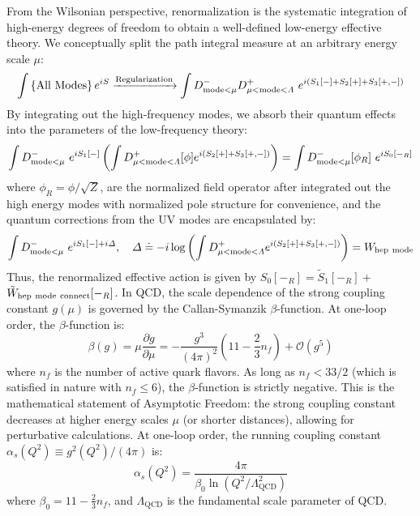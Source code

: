 From the Wilsonian perspective, renormalization is the systematic integration of high-energy degrees of freedom to obtain a well-defined low-energy effective theory. We conceptually split the path integral measure at an arbitrary energy scale $\mu$:
\begin{equation}
\int{\left\{ {\rm All\ Modes} \right\} e^{iS}} \xrightarrow{\rm Regularization}\int{D^-_{{\rm mode}<\mu} D^+_{\mu <{\rm mode}<\varLambda}}\ e^{i\left( S_1\left[ - \right] +S_2\left[ + \right] +S_3\left[ +,- \right] \right)}
\end{equation}
By integrating out the high-frequency modes, we absorb their quantum effects into the parameters of the low-frequency theory:
\begin{equation}
\int{D^-_{{\rm mode}<\mu}\ e^{iS_1\left[ - \right]}\left( \int{D^+_{\mu <{\rm mode}<\varLambda}[\phi]e^{i\left( S_2\left[ + \right] +S_3\left[ +,- \right] \right)}} \right)} =\int{D^-_{{\rm mode}<\mu}}[\phi_R]\ e^{iS_0\left[ -_R \right]}
\end{equation}
where $\phi_R=\phi /\sqrt{Z}$, are the normalized field operator after integrated out the high energy modes with normalized pole structure for convenience, and the quantum corrections from the UV modes are encapsulated by:
\begin{equation}
\int{D^-_{{\rm mode}<\mu}\ e^{iS_1\left[ - \right] +i\varDelta}}, \quad \varDelta \doteq -i\log \left( \int{D^+_{\mu <{\rm mode}<\varLambda}e^{i\left( S_2\left[ + \right] +S_3\left[ +,- \right] \right)}} \right) =W_{\rm hep\ mode}
\end{equation}
Thus, the renormalized effective action is given by $S_0[-_R]=\tilde S_1[-_R]+$
$\tilde W_{\rm hep\ mode\ connect}[-_R]$. In QCD, the scale dependence of the strong coupling constant $g(\mu)$ is governed by the Callan-Symanzik $\beta$-function. At one-loop order, the $\beta$-function is:
\begin{equation}
\beta(g) = \mu \frac{\partial g}{\partial \mu} = - \frac{g^3}{(4\pi)^2} \left( 11 - \frac{2}{3}n_f \right) + \mathcal{O}(g^5)
\label{eq:qcd_beta_function}
\end{equation}
where $n_f$ is the number of active quark flavors. As long as $n_f < 33/2$ (which is satisfied in nature with $n_f \le 6$), the $\beta$-function is strictly negative. This is the mathematical statement of Asymptotic Freedom: the strong coupling constant decreases at higher energy scales $\mu$ (or shorter distances), allowing for perturbative calculations. At one-loop order, the running coupling constant $\alpha_s(Q^2) \equiv g^2(Q^2)/(4\pi)$ is:
\begin{equation}
\alpha_s(Q^2) = \frac{4\pi}{\beta_0 \ln(Q^2/\Lambda_{\mathrm{QCD}}^2)}
\end{equation}
where $\beta_0 = 11 - \frac{2}{3}n_f$, and $\Lambda_{\mathrm{QCD}}$ is the fundamental scale parameter of QCD.

